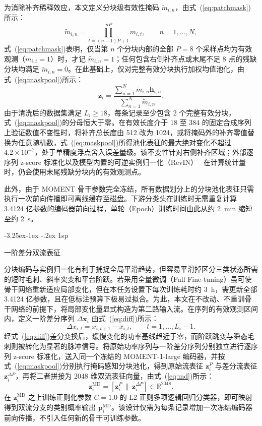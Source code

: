 \documentclass[12pt]{iopjournal}
\makeatletter
\renewcommand\subsection{\@startsection{subsection}{2}{\z@}%
                   {-3.25ex\@plus -1ex \@minus -.2ex}%
                   {1sp}%
                   {\reset@font\normalsize\bfseries\raggedright}}
\makeatother
\begin{document}
为消除补齐稀释效应，本文定义分块级有效性掩码 $\tilde{m}_{i,n}$，由式~(\ref{eq:patchmask})所示：
\begin{equation}
\tilde{m}_{i,n}=\prod_{t=(n-1)P+1}^{nP}m_{i,t},\qquad n=1,\ldots,N,
\label{eq:patchmask}
\end{equation}
式~(\ref{eq:patchmask})表明，仅当第 $n$ 个分块内部的全部 $P=8$ 个采样点均为有效观测（$m_{i,t}=1$）时，才记 $\tilde{m}_{i,n}=1$；任何包含右侧补齐点或末尾不足 8 点的残缺分块均满足 $\tilde{m}_{i,n}=0$。在此基础上，仅对完整有效分块执行加权均值池化，由式~(\ref{eq:maskpool})所示：
\begin{equation}
\bm{z}_i=\frac{\sum_{n=1}^{N}\tilde{m}_{i,n}\bm{h}_{i,n}}{\sum_{n=1}^{N}\tilde{m}_{i,n}}.
\label{eq:maskpool}
\end{equation}
由于清洗后的数据集满足 $L_i\ge 18$，每条记录至少包含 2 个完整有效分块，式~(\ref{eq:maskpool})的分母恒大于零。在有效长度介于 18 至 384 的固定合成序列上验证数值不变性时，将补齐总长度由 512 改为 1024，或将掩码外的补齐零值替换为任意随机数，式~(\ref{eq:maskpool})所得池化表征的最大绝对变化不超过 $4.2\times 10^{-7}$，处于单精度浮点舍入误差量级。该不变性针对右侧补齐区域；外部逐序列 z-score 标准化以及模型内置的可逆实例归一化（RevIN）~\cite{kim2022} 在计算统计量时，仍会使用末尾残缺分块内的有效观测点。

此外，由于 MOMENT 骨干参数完全冻结，所有数据划分上的分块池化表征只需执行一次前向传播即可离线缓存至磁盘。下游分类头在训练时无需重复计算 3.4124 亿参数的编码器前向过程，单轮（Epoch）训练时间由此从约 2~min 缩短至约 2~s。

\subsection{一阶差分双流表征}\label{sec:dual}

分块编码与实例归一化有利于捕捉全局平滑趋势，但容易平滑掉区分三类状态所需的短时毛刺、斜率突变和平台阶跃。若采用全量微调（Full Fine-tuning）虽可使骨干网络重新适应局部变化，但在本任务设置下每次训练耗时约 3~h，需更新全部 3.4124 亿参数，且在低标注预算下极易过拟合。为此，本文在不改动、不重训骨干网络的前提下，将局部变化量显式构造为第二路输入流。在序列的有效观测区间内，定义一阶差分序列 $\Delta\bm{x}_i$ 由式~(\ref{eq:diff})所示：
\begin{equation}
\Delta x_{i,t}=x_{i,t+1}-x_{i,t},\qquad t=1,\ldots,L_i-1.
\label{eq:diff}
\end{equation}
经式~(\ref{eq:diff})差分变换后，缓慢变化的功率基线趋近于零，而阶跃跳变与瞬态毛刺则被转化为显著的脉冲信号。将原始功率序列与一阶差分序列分别独立进行逐序列 z-score 标准化，送入同一个冻结的 MOMENT-1-large 编码器，并按式~(\ref{eq:maskpool})分别执行掩码感知分块池化，得到原始流表征 $\bm{z}_i^{P}$ 与差分流表征 $\bm{z}_i^{\Delta P}$，再将二者拼接为 2048 维双流表征向量，由式~(\ref{eq:md})所示：
\begin{equation}
\bm{z}_i^{\mathrm{MD}}=\left[\bm{z}_i^{P}\,\|\,\bm{z}_i^{\Delta P}\right]\in\mathbb{R}^{2048}.
\label{eq:md}
\end{equation}
在 $\bm{z}_i^{\mathrm{MD}}$ 之上训练正则化参数 $C=1.0$ 的 L2 正则多项逻辑回归分类器，即可映射得到双流分支的类别概率输出 $\bm{p}_i^{\mathrm{MD}}$。该设计仅需为每条记录增加一次冻结编码器前向传播，不引入任何新的骨干可训练参数。
\end{document}
